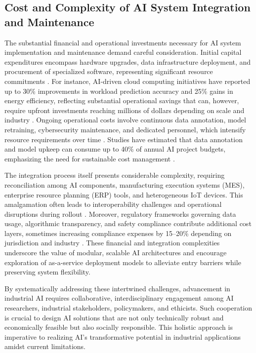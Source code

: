 \documentclass[sigconf]{acmart}
\begin{document}
\subsection{Cost and Complexity of AI System Integration and Maintenance}

The substantial financial and operational investments necessary for AI system implementation and maintenance demand careful consideration. Initial capital expenditures encompass hardware upgrades, data infrastructure deployment, and procurement of specialized software, representing significant resource commitments \cite{ref11,ref12,ref35}. For instance, AI-driven cloud computing initiatives have reported up to 30\% improvements in workload prediction accuracy and 25\% gains in energy efficiency, reflecting substantial operational savings that can, however, require upfront investments reaching millions of dollars depending on scale and industry \cite{ref12}. Ongoing operational costs involve continuous data annotation, model retraining, cybersecurity maintenance, and dedicated personnel, which intensify resource requirements over time \cite{ref7,ref9,ref20}. Studies have estimated that data annotation and model upkeep can consume up to 40\% of annual AI project budgets, emphasizing the need for sustainable cost management \cite{ref7,ref9}.

The integration process itself presents considerable complexity, requiring reconciliation among AI components, manufacturing execution systems (MES), enterprise resource planning (ERP) tools, and heterogeneous IoT devices. This amalgamation often leads to interoperability challenges and operational disruptions during rollout \cite{ref6,ref44}. Moreover, regulatory frameworks governing data usage, algorithmic transparency, and safety compliance contribute additional cost layers, sometimes increasing compliance expenses by 15–20\% depending on jurisdiction and industry \cite{ref2,ref13}. These financial and integration complexities underscore the value of modular, scalable AI architectures and encourage exploration of as-a-service deployment models to alleviate entry barriers while preserving system flexibility.

\vspace{1em}
By systematically addressing these intertwined challenges, advancement in industrial AI requires collaborative, interdisciplinary engagement among AI researchers, industrial stakeholders, policymakers, and ethicists. Such cooperation is crucial to design AI solutions that are not only technically robust and economically feasible but also socially responsible. This holistic approach is imperative to realizing AI's transformative potential in industrial applications amidst current limitations.
\end{document}
